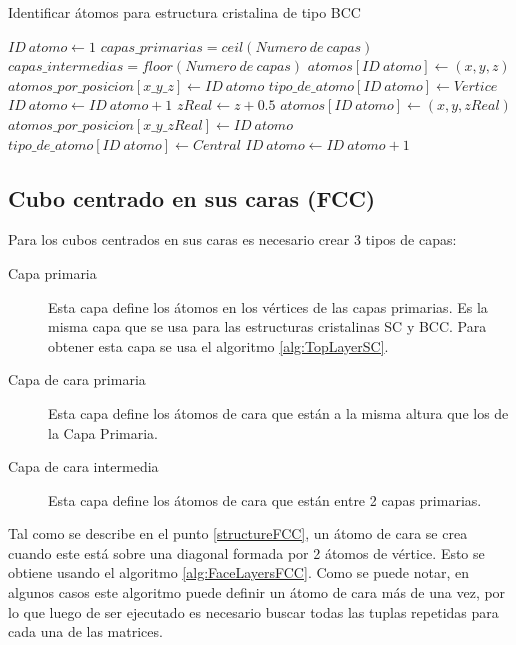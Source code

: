 \begin{algorithm}[ht]
  \caption{Identificar átomos para estructura cristalina de tipo BCC}
  \label{alg:identifyAtomsBCC}
  \begin{algorithmic}[1]
    \STATE $ID\ atomo \leftarrow 1$
    \STATE $capas\_primarias = ceil(Numero\ de\ capas)$
    \STATE $capas\_intermedias = floor(Numero\ de\ capas)$
        \STATE $atomos[ID\ atomo] \leftarrow (x, y, z)$
        \STATE $atomos\_por\_posicion[x\_y\_z] \leftarrow ID\ atomo$
        \STATE $tipo\_de\_atomo[ID\ atomo] \leftarrow Vertice$
        \STATE $ID\ atomo \leftarrow ID\ atomo + 1$
      \ENDFOR
    \ENDFOR
        \STATE $zReal \leftarrow z + 0.5$
        \STATE $atomos[ID\ atomo] \leftarrow (x, y, zReal)$
        \STATE $atomos\_por\_posicion[x\_y\_zReal] \leftarrow ID\ atomo$
        \STATE $tipo\_de\_atomo[ID\ atomo] \leftarrow Central$
        \STATE $ID\ atomo \leftarrow ID\ atomo + 1$
      \ENDFOR
    \ENDFOR
  \end{algorithmic}
\end{algorithm}

\subsection{Cubo centrado en sus caras (FCC)}

Para los cubos centrados en sus caras es necesario crear 3 tipos de capas:
\begin{description}
  \item[Capa primaria] Esta capa define los átomos en los vértices de las capas primarias. Es la misma capa que se usa para las estructuras cristalinas SC y BCC. Para obtener esta capa se usa el algoritmo \ref{alg:TopLayerSC}.
  \item[Capa de cara primaria] Esta capa define los átomos de cara que están a la misma altura que los de la Capa Primaria.
  \item[Capa de cara intermedia] Esta capa define los átomos de cara que están entre 2 capas primarias.
\end{description}

Tal como se describe en el punto \ref{structureFCC}, un átomo de cara se crea cuando este está sobre una diagonal formada por 2 átomos de vértice. Esto se obtiene usando el algoritmo \ref{alg:FaceLayersFCC}. Como se puede notar, en algunos casos este algoritmo puede definir un átomo de cara más de una vez, por lo que luego de ser ejecutado es necesario buscar todas las tuplas repetidas para cada una de las matrices.

